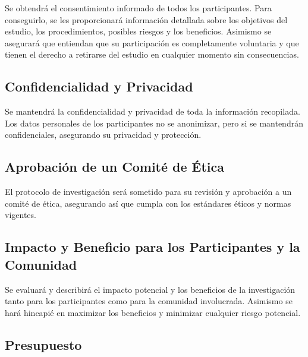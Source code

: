 \documentclass[jou]{apa7}
\begin{document}
	Se obtendrá el consentimiento informado de todos los participantes. Para
	conseguirlo, se les proporcionará información detallada sobre los
	objetivos del estudio, los procedimientos, posibles riesgos y los
	beneficios. Asimismo se asegurará que entiendan que su participación es
	completamente voluntaria y que tienen el derecho a retirarse del estudio
	en cualquier momento sin consecuencias.
	
	\subsection{Confidencialidad y Privacidad}\label{confidencialidad-y-privacidad}
	
	Se mantendrá la confidencialidad y privacidad de toda la información
	recopilada. Los datos personales de los participantes no se anonimizar,
	pero si se mantendrán confidenciales, asegurando su privacidad y
	protección.
	
	\subsection{Aprobación de un Comité de Ética}\label{aprobaciuxf3n-de-un-comituxe9-de-uxe9tica}
	
	El protocolo de investigación será sometido para su revisión y
	aprobación a un comité de ética, asegurando así que cumpla con los
	estándares éticos y normas vigentes.
	
	\subsection{Impacto y Beneficio para los Participantes y la Comunidad}\label{impacto-y-beneficio-para-los-participantes-y-la-comunidad}
	
	Se evaluará y describirá el impacto potencial y los beneficios de la
	investigación tanto para los participantes como para la comunidad
	involucrada. Asimismo se hará hincapié en maximizar los beneficios y
	minimizar cualquier riesgo potencial.
	
	\subsection{Presupuesto}\label{presupuesto}
	
\end{document}
